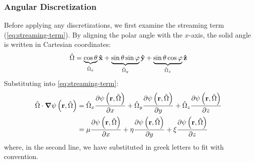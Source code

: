 \begin{frame}
        \frametitle{Angular Discretization}
        Before applying any discretizations, we first examine the streaming term (\cref{eq:streaming-term}).
        By aligning the polar angle with the $x$-axis, the solid angle is written in Cartesian coordinates:
        \begin{equation}
                \label{eq:solid-angle-expansion}
                \hat{\Omega} = \underbrace{\cos \theta}_{\hat{\Omega}_x} \mathbf{\hat{x}}+\underbrace{\sin\theta \sin\varphi}_{\hat{\Omega}_y} \mathbf{\hat{y}} + \underbrace{\sin\theta \cos \varphi}_{\hat{\Omega}_z} \mathbf{\hat{z}}
        \end{equation}
        Substituting into \cref{eq:streaming-term}:
        \begin{equation}
                \begin{split}
                        \hat{\Omega} \cdot \grad \psi\left(\mathbf{r},\hat{\Omega}\right) & = \hat{\Omega}_x \pdv{\psi\left(\mathbf{r},\hat{\Omega}\right)}{x}+\hat{\Omega}_y\pdv{\psi\left(\mathbf{r},\hat{\Omega}\right)}{y}+\hat{\Omega}_z\pdv{\psi\left(\mathbf{r},\hat{\Omega}\right)}{z} \\
                                                     & = \mu \pdv{\psi\left(\mathbf{r},\hat{\Omega}\right)}{x}+\eta\pdv{\psi\left(\mathbf{r},\hat{\Omega}\right)}{y}+\xi\pdv{\psi\left(\mathbf{r},\hat{\Omega}\right)}{z}
                \end{split}
        \end{equation}
        where, in the second line, we have substituted in greek letters to fit with convention.
\end{frame}

